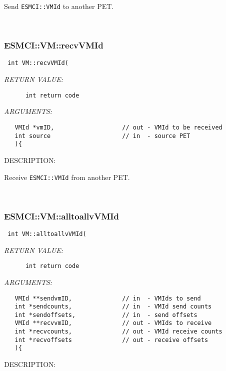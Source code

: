 {      Send {\tt ESMCI::VMId} to another PET.
   
 
\mbox{}\hrulefill\
 
\subsubsection [ESMCI::VM::recvVMId] {ESMCI::VM::recvVMId}


  
\begin{verbatim} int VM::recvVMId(\end{verbatim}{\em RETURN VALUE:}
\begin{verbatim}      int return code\end{verbatim}{\em ARGUMENTS:}
\begin{verbatim}   VMId *vmID,                   // out - VMId to be received
   int source                    // in  - source PET
   ){\end{verbatim}
{\sf DESCRIPTION:\\ }


      Receive {\tt ESMCI::VMId} from another PET.
   
 
\mbox{}\hrulefill\
 
\subsubsection [ESMCI::VM::alltoallvVMId] {ESMCI::VM::alltoallvVMId}


  
\begin{verbatim} int VM::alltoallvVMId(\end{verbatim}{\em RETURN VALUE:}
\begin{verbatim}      int return code\end{verbatim}{\em ARGUMENTS:}
\begin{verbatim}   VMId **sendvmID,              // in  - VMIds to send
   int *sendcounts,              // in  - VMId send counts
   int *sendoffsets,             // in  - send offsets
   VMId **recvvmID,              // out - VMIds to receive
   int *recvcounts,              // out - VMId receive counts
   int *recvoffsets              // out - receive offsets
   ){\end{verbatim}
{\sf DESCRIPTION:\\ }


}

